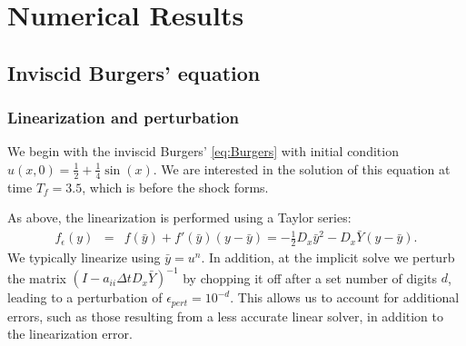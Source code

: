 \documentclass{siamart251104}
\newcommand{\dt}{\Delta t}
\begin{document}
\section{Numerical Results}
\label{sec:NumCor}

 
 
 

\subsection{Inviscid Burgers' equation}

\subsubsection{Linearization and perturbation}
We begin with the inviscid Burgers'  \eqref{eq:Burgers}
with initial condition $u(x,0)= \frac{1}{2} + \frac{1}{4} \sin(x)$.
We are interested in the solution of this equation at time $T_f = 3.5$, which is before the shock forms.

As above, the  linearization is performed using a Taylor series:
\begin{eqnarray}
f_{\epsilon}(y) &=&  f(\bar{y}) + 
    f'(\bar{y}) \left( y - \bar{y} \right) 
    =  - \frac{1}{2} D_x \bar{y}^2
    - D_x \bar{Y} \left( y - \bar{y} \right) .
\end{eqnarray}
We typically linearize using $\bar{y} = u^n$. 
In addition, at the implicit solve we  perturb the matrix 
$(I - a_{ii} \dt D_x \bar{Y})^{-1}$
by chopping it off after a set number of digits $d$, 
leading to  a perturbation of $\epsilon_{pert} = 10^{-d}. $
This allows us to account for additional errors, such as those resulting from a 
less accurate linear solver, in addition to the linearization error.
\end{document}
